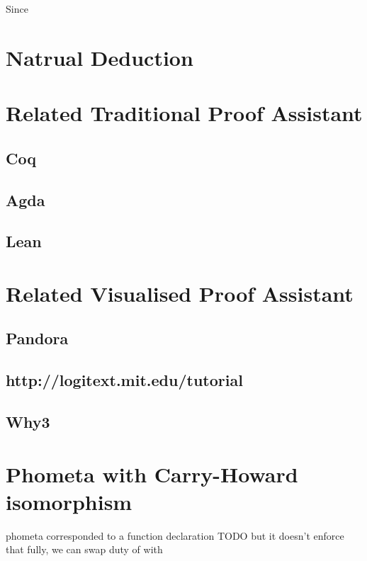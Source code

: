 Since


\section{Natrual Deduction}

\section{Related Traditional Proof Assistant}
\subsection{Coq}
\subsection{Agda}
\subsection{Lean}

\section{Related Visualised Proof Assistant}
\subsection{Pandora}
\subsection{http://logitext.mit.edu/tutorial}
\subsection{Why3}

\section{Phometa with Carry-Howard isomorphism}
phometa \kRule corresponded to a function declaration TODO
but it doesn't enforce that fully, we can swap duty of \kRule with \kDefinition
